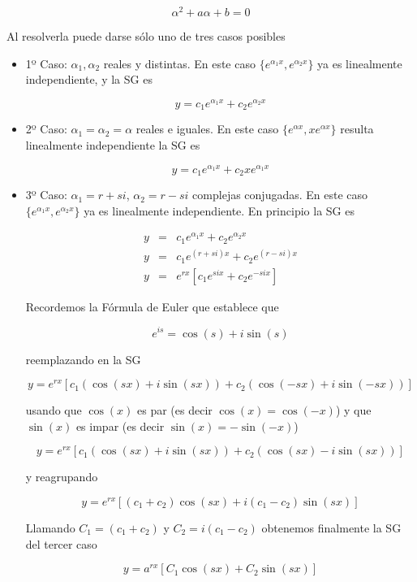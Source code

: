 $$ \alpha^2 + a\alpha + b = 0 $$

Al resolverla puede darse sólo uno de tres casos posibles

\begin{itemize}

\item 1º Caso: $ \alpha_1, \alpha_2$ reales y distintas.  En este caso $\{e^{\alpha_1 x}, e^{\alpha_2 x}\}$ ya es linealmente independiente, y la SG es

$$ y = c_1 e^{\alpha_1 x} + c_2 e^{\alpha_2 x} $$

\item 2º Caso: $ \alpha_1 = \alpha_2 = \alpha$ reales e iguales.  En este caso $\{e^{\alpha x}, x e^{\alpha x}\}$ resulta linealmente independiente la SG es

$$ y = c_1 e^{\alpha_1 x} + c_2 x e^{\alpha_1 x} $$

\item 3º Caso: $ \alpha_1 = r+si$, $ \alpha_2 = r-si$ complejas conjugadas.  En este caso $\{e^{\alpha_1 x}, e^{\alpha_2 x}\}$ ya es linealmente independiente.  En principio la SG es

\begin{eqnarray*} y &=& c_1 e^{\alpha_1 x} + c_2 e^{\alpha_2 x} \\
y &=& c_1 e^{(r+si) x} + c_2 e^{(r-si) x} \\
y &=& e^{rx} [ c_1 e^{six} + c_2 e^{-six} ] \end{eqnarray*}

Recordemos la Fórmula de Euler que establece que

$$ e^{is} = \cos(s) + i \sin(s) $$

reemplazando en la SG

$$ y = e^{rx} [ c_1 (\cos(sx) + i \sin(sx)) + c_2 ( \cos(-sx) + i \sin(-sx) ) ] $$

usando que $\cos(x)$ es par (es decir $\cos(x) = \cos(-x)$) y que $\sin(x)$ es impar (es decir $\sin(x) = -\sin(-x)$)

$$ y = e^{rx} [ c_1 (\cos(sx) + i \sin(sx)) + c_2 ( \cos(sx) - i \sin(sx) ) ] $$

y reagrupando

$$ y = e^{rx} [ (c_1 + c_2) \cos(sx)  + i (c_1 - c_2) \sin(sx) ] $$

Llamando $C_1 = (c_1 + c_2)$ y $C_2 = i (c_1 - c_2) $ obtenemos finalmente la SG del tercer caso

$$ y = a^{rx} [C_1 \cos(sx) + C_2 \sin(sx)]$$

\end{itemize}

